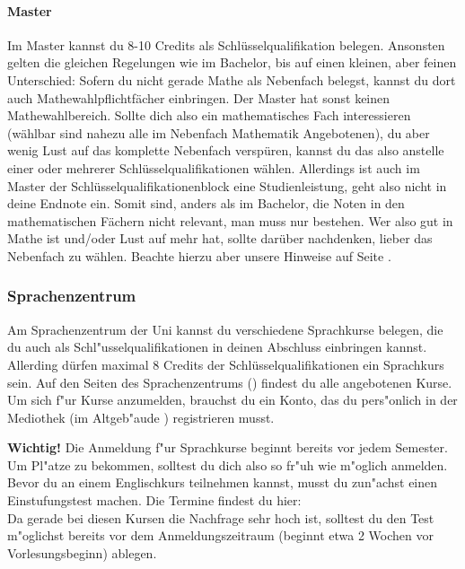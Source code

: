\begin{multicols}{2}
\paragraph*{Master}
Im Master kannst du 8-10 Credits als Schlüsselqualifikation
belegen. Ansonsten gelten die gleichen Regelungen wie im Bachelor, bis
auf einen kleinen, aber feinen Unterschied: Sofern du nicht gerade
Mathe als Nebenfach belegst, kannst du dort auch
Mathewahlpflichtfächer einbringen. Der Master hat sonst keinen
Mathewahlbereich. Sollte dich also ein mathematisches Fach
interessieren (wählbar sind nahezu alle im Nebenfach Mathematik Angebotenen), du
aber wenig Lust auf das komplette Nebenfach verspüren, kannst du das
also anstelle einer oder mehrerer Schlüsselqualifikationen
wählen. Allerdings ist auch im Master der
Schlüsselqualifikationenblock eine Studienleistung, geht also nicht in
deine Endnote ein. Somit sind, anders als im Bachelor, die Noten in
den mathematischen Fächern nicht relevant, man muss nur bestehen. Wer
also gut in Mathe ist und/oder Lust auf mehr hat, sollte darüber
nachdenken, lieber das Nebenfach zu wählen. Beachte hierzu aber unsere
Hinweise auf Seite \pageref{nebenfach}.
%
\subsubsection*{Sprachenzentrum}
Am Sprachenzentrum der Uni kannst du verschiedene Sprachkurse belegen,
die du auch als Schl"usselqualifikationen in deinen Abschluss
einbringen kannst. Allerding dürfen maximal 8 Credits der
Schlüsselqualifikationen ein Sprachkurs sein.
Auf den Seiten des Sprachenzentrums () findest du alle angebotenen Kurse.
Um sich f"ur Kurse anzumelden, brauchst du ein Konto, das du pers"onlich in der Mediothek (im Altgeb"aude ) registrieren musst.

\textbf{Wichtig!} Die Anmeldung f"ur Sprachkurse beginnt bereits vor jedem Semester.
Um Pl"atze zu bekommen, solltest du dich also so fr"uh wie m"oglich anmelden.
Bevor du an einem Englischkurs teilnehmen kannst, musst du zun"achst einen Einstufungstest machen.
Die Termine findest du hier: \\
Da gerade bei diesen Kursen die Nachfrage sehr hoch ist, solltest du den Test m"oglichst bereits vor dem Anmeldungszeitraum (beginnt etwa 2 Wochen vor Vorlesungsbeginn) ablegen.


\end{multicols}
